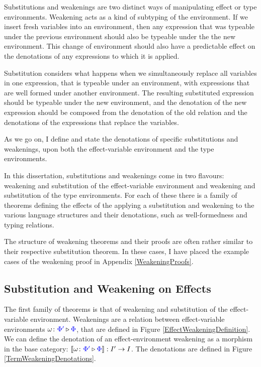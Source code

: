 \documentclass{Report}
\begin{document}
Substitutions and weakenings are two distinct ways of manipulating effect or type environments. Weakening acts as a kind of subtyping of the environment. If we insert fresh variables into an environment, then any expression that was typeable under the previous environment should also be typeable under the the new environment. This change of environment should also have a predictable effect on the denotations of any expressions to which it is applied.

Substitution considers what happens when we simultaneously replace all variables in one expression, that is typeable under an environment, with expressions that are well formed under another environment. The resulting substituted expression should be typeable under the new environment, and the denotation of the new expression should be composed from the denotation of the old relation and the denotations of the expressions that replace the variables. 

As we go on, I define and state the denotations of specific substitutions and weakenings, upon both the effect-variable environment and the type environments.

In this dissertation, substitutions and weakenings come in two flavours: weakening and substitution of the effect-variable environment and weakening and substitution of the type environments. For each of these there is a family of theorems defining the effects of the applying a substitution and weakening to the various language structures and their denotations, such as well-formedness and typing relations.

\begin{framed}
    \begin{aside}
        The structure of weakening theorems and their proofs are often rather similar to their respective substitution theorem. In these cases, I have placed the example cases of the weakening proof in Appendix \ref{WeakeningProofs}.
    \end{aside}
\end{framed}

\subsection{Substitution and Weakening on Effects}\label{SectionEffectSubstitution}

The first family of theorems is that of weakening and substitution of the effect-variable environment. Weakenings are a relation between effect-variable environments $\omega \colon {\color{blue}\Phi'} \triangleright {\color {blue} \Phi}$, that are defined in Figure \ref{EffectWeakeningDefinition}. We can define the denotation of an effect-environment weakening as a morphism in the base category: ${\bf [\![}\omega \colon {\color{blue}\Phi'} \triangleright {\color {blue} \Phi}{\bf ]\!]}: I' \rightarrow I$. The denotations are defined in Figure \ref{TermWeakeningDenotations}.
\end{document}

